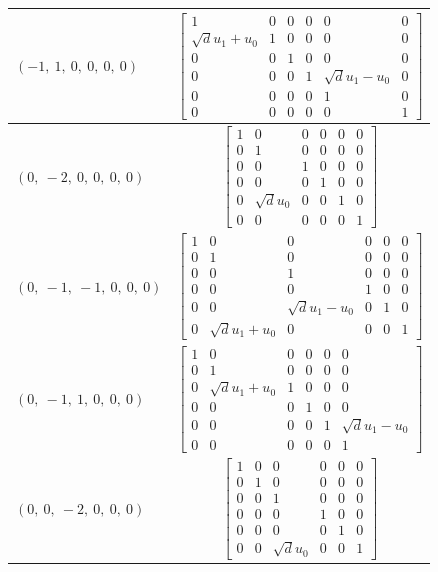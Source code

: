 \documentclass[11pt]{article}
\theoremstyle{definition}
\begin{document}
\begin{longtable}{|l|c|}
    \hline
    $\left( -1, \  1, \  0, \  0, \  0, \  0\right)$ & ${\left[\begin{matrix}1 & 0 & 0 & 0 & 0 & 0\\\sqrt{d} u_{1} + u_{0} & 1 & 0 & 0 & 0 & 0\\0 & 0 & 1 & 0 & 0 & 0\\0 & 0 & 0 & 1 & \sqrt{d} u_{1} - u_{0} & 0\\0 & 0 & 0 & 0 & 1 & 0\\0 & 0 & 0 & 0 & 0 & 1\end{matrix}\right]}$ \\
    \hline
    $\left( 0, \  -2, \  0, \  0, \  0, \  0\right)$ & ${\left[\begin{matrix}1 & 0 & 0 & 0 & 0 & 0\\0 & 1 & 0 & 0 & 0 & 0\\0 & 0 & 1 & 0 & 0 & 0\\0 & 0 & 0 & 1 & 0 & 0\\0 & \sqrt{d} u_{0} & 0 & 0 & 1 & 0\\0 & 0 & 0 & 0 & 0 & 1\end{matrix}\right]}$ \\
    \hline
    $\left( 0, \  -1, \  -1, \  0, \  0, \  0\right)$ & ${\left[\begin{matrix}1 & 0 & 0 & 0 & 0 & 0\\0 & 1 & 0 & 0 & 0 & 0\\0 & 0 & 1 & 0 & 0 & 0\\0 & 0 & 0 & 1 & 0 & 0\\0 & 0 & \sqrt{d} u_{1} - u_{0} & 0 & 1 & 0\\0 & \sqrt{d} u_{1} + u_{0} & 0 & 0 & 0 & 1\end{matrix}\right]}$ \\
    \hline
    $\left( 0, \  -1, \  1, \  0, \  0, \  0\right)$ & ${\left[\begin{matrix}1 & 0 & 0 & 0 & 0 & 0\\0 & 1 & 0 & 0 & 0 & 0\\0 & \sqrt{d} u_{1} + u_{0} & 1 & 0 & 0 & 0\\0 & 0 & 0 & 1 & 0 & 0\\0 & 0 & 0 & 0 & 1 & \sqrt{d} u_{1} - u_{0}\\0 & 0 & 0 & 0 & 0 & 1\end{matrix}\right]}$ \\
    \hline
    $\left( 0, \  0, \  -2, \  0, \  0, \  0\right)$ & ${\left[\begin{matrix}1 & 0 & 0 & 0 & 0 & 0\\0 & 1 & 0 & 0 & 0 & 0\\0 & 0 & 1 & 0 & 0 & 0\\0 & 0 & 0 & 1 & 0 & 0\\0 & 0 & 0 & 0 & 1 & 0\\0 & 0 & \sqrt{d} u_{0} & 0 & 0 & 1\end{matrix}\right]}$ \\

\end{longtable}
\end{document}
